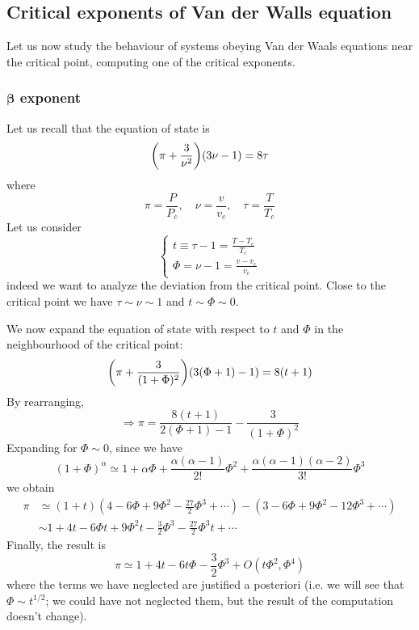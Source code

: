 \documentclass[../main/main.tex]{subfiles}
\begin{document}
\subsection{Critical exponents of Van der Walls equation}
Let us now study the behaviour of systems obeying Van der Waals equations near the critical point, computing one of the critical exponents.

\subsubsection{\( \pmb{\beta}  \) exponent}
Let us recall that the equation of state is
\begin{equation*}
  \qty(\pi + \frac{3}{\nu ^2}) \qty(3 \nu - 1) = 8 \tau
\end{equation*}
where
\begin{equation*}
  \pi = \frac{P}{P_c}, \quad \nu = \frac{v }{v_c}, \quad \tau = \frac{T}{T_c}
\end{equation*}
Let us consider
\begin{equation}
  \begin{cases}
   t \equiv \tau -1 = \frac{T-T_c}{T_c} \\
   \Phi = \nu -1 = \frac{v-v_c}{v_c}
  \end{cases}
\end{equation}
indeed we want to analyze the deviation from the critical point.
Close to the critical point we have \( \tau \sim \nu \sim 1 \) and \( t \sim \Phi \sim 0 \).

We now expand the equation of state with respect to \( t \) and \( \Phi  \) in the neighbourhood of the critical point:
\begin{equation*}
  \qty(\pi + \frac{3}{(1+\Phi )^2}) \qty(3 (\Phi +1) -1) = 8 (t+1)
\end{equation*}
By rearranging,
\begin{equation*}
  \Rightarrow \pi = \frac{8(t+1)}{2(\Phi +1)-1} - \frac{3}{(1+\Phi )^2}
\end{equation*}
Expanding for \( \Phi \sim 0 \), since we have
\begin{equation*}
  (1+\Phi )^ \alpha \simeq 1 + \alpha \Phi + \frac{\alpha (\alpha -1)}{2!}\Phi ^2 + \frac{\alpha (\alpha -1)(\alpha -2)}{3!}\Phi ^3
\end{equation*}
we obtain
\begin{equation*}
\begin{split}
\pi  &\simeq (1+t)\left(4-6 \Phi  +9\Phi ^{2}-{\frac {27}{2}}\Phi ^{3}+\cdots \right)-(3-6\Phi +9\Phi ^{2}-12\Phi ^{3}+\cdots ) \\
&\sim 1+4t-6\Phi t+9\Phi ^{2}t-{\frac {3}{2}}\Phi ^{3}-{\frac {27}{2}}\Phi ^{3}t+\cdots
\end{split}
\end{equation*}
Finally, the result is
\begin{equation}
  \pi \simeq 1 + 4 t - 6 t \Phi - \frac{3}{2} \Phi ^3 + O (t \Phi ^2,\Phi ^4)
  \label{eq:14_7}
\end{equation}
where the terms we have neglected are justified a posteriori  (i.e. we will see that
\( \Phi \sim t^{1/2} \); we could have not neglected them, but the result of the computation doesn't change).
\end{document}
